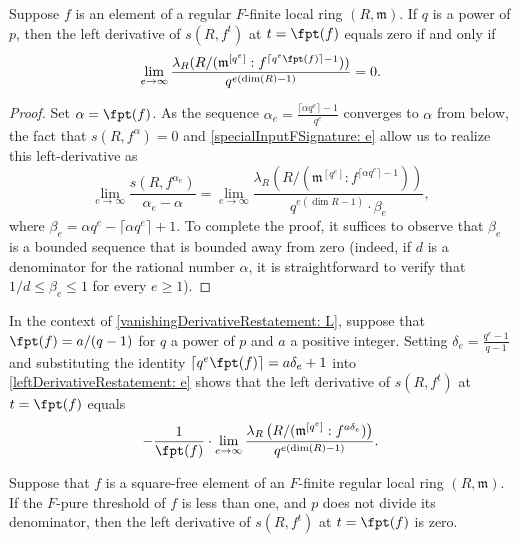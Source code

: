 \documentclass[11pt]{amsart}
\begin{document}
\begin{lemma}
\label{vanishingDerivativeRestatement: L}
Suppose $f$ is an element of a regular $F$-finite local ring $(R, {\mathfrak{m}})$.  If $q$ is a power of $p$, then the left derivative of $s(R, f^t)$ at $t = \fpt(f)$ equals zero if and only if
\[ \lim_{e \to \infty} \frac{ \lambda_R (R/ ({\mathfrak{m}}^{[q^e]} : f^{\lceil q^e \fpt(f)  \rceil - 1}) )}{q^{e(\dim(R)-1)}} = 0.\]
\end{lemma}

\begin{proof}  Set $\alpha = \fpt(f)$.  As the sequence $\alpha_e = \frac{ \lceil  \alpha q^e \rceil - 1 }{q^e}$ converges to $\alpha$ from below, the fact that $s(R,f^{\alpha}) = 0$ and \eqref{specialInputFSignature: e} allow us to realize this left-derivative as
\begin{equation}
\label{leftDerivativeRestatement: e}
 \lim_{e \to \infty} \frac{s(R, f^{\alpha_e})}{\alpha_e - \alpha} = \lim_{e \to \infty} \frac{ \lambda_R( R/ ({\mathfrak{m}}^{[q^e]} : f^{\lceil \alpha q^e \rceil - 1}))}{q^{e(\dim R - 1)} \cdot \beta_e},
 \end{equation}  where $\beta_e = \alpha q^e - \lceil \alpha q^e \rceil +1$.   To complete the proof, it suffices to observe that $\beta_e$ is a bounded sequence that is bounded away from zero (indeed, if $d$ is a denominator for the rational number $\alpha$,  it is straightforward to verify that $1/d \leq \beta_e \leq 1$ for every $e \geq 1$).
\end{proof}

\begin{remark}
\label{leftDerivativeRestatement: R}
In the context of \autoref{vanishingDerivativeRestatement: L}, suppose that $\fpt(f) = a/(q-1)$ for $q$ a power of $p$ and $a$ a positive integer.  Setting $\delta_e = \frac{q^e-1}{q-1}$ and substituting the identity $\lceil q^e \fpt(f) \rceil  = a \delta_e + 1$ into \eqref{leftDerivativeRestatement: e} shows that the left derivative of $s(R,f^t)$ at $t=\fpt(f)$ equals \[ - \frac{1}{\fpt(f)} \cdot \lim \limits_{e \to \infty} \frac{\lambda_R\left(R/({\mathfrak{m}}^{[q^e]} : f^{a \delta_e })\right)}{{q^{e (\dim(R)-1)}}}.\]
\end{remark}

\begin{theorem}
\label{thm.LeftDerivativeOfFSig}
 Suppose that $f$ is a square-free element of an $F$-finite regular local ring $(R, {\mathfrak{m}})$.
If the $F$-pure threshold of $f$ is less than one, and $p$ does not divide its denominator, then the left derivative of $s(R, f^t)$ at $t=\fpt(f)$ is zero.
\end{theorem}
\end{document}
